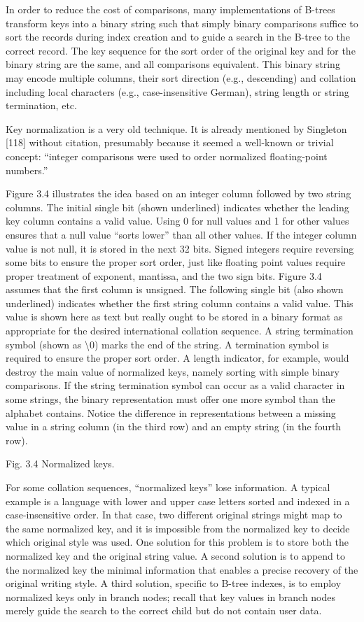 In order to reduce the cost of comparisons, many implementations of
B-trees transform keys into a binary string such that simply binary
comparisons suffice to sort the records during index creation and to
guide a search in the B-tree to the correct record. The key sequence for
the sort order of the original key and for the binary string are the
same, and all comparisons equivalent. This binary string may encode
multiple columns, their sort direction (e.g., descending) and collation
including local characters (e.g., case-insensitive German), string
length or string termination, etc.

Key normalization is a very old technique. It is already mentioned by
Singleton {[}118{]} without citation, presumably because it seemed a
well-known or trivial concept: ``integer comparisons were used to order
normalized floating-point numbers.''

Figure 3.4 illustrates the idea based on an integer column followed by
two string columns. The initial single bit (shown underlined) indicates
whether the leading key column contains a valid value. Using 0 for null
values and 1 for other values ensures that a null value ``sorts lower''
than all other values. If the integer column value is not null, it is
stored in the next 32 bits. Signed integers require reversing some bits
to ensure the proper sort order, just like floating point values require
proper treatment of exponent, mantissa, and the two sign bits. Figure
3.4 assumes that the first column is unsigned. The following single bit
(also shown underlined) indicates whether the first string column
contains a valid value. This value is shown here as text but really
ought to be stored in a binary format as appropriate for the desired
international collation sequence. A string termination symbol (shown as
\textbackslash{}0) marks the end of the string. A termination symbol is
required to ensure the proper sort order. A length indicator, for
example, would destroy the main value of normalized keys, namely sorting
with simple binary comparisons. If the string termination symbol can
occur as a valid character in some strings, the binary representation
must offer one more symbol than the alphabet contains. Notice the
difference in representations between a missing value in a string column
(in the third row) and an empty string (in the fourth row).

Fig. 3.4 Normalized keys.

For some collation sequences, ``normalized keys'' lose information. A
typical example is a language with lower and upper case letters sorted
and indexed in a case-insensitive order. In that case, two different
original strings might map to the same normalized key, and it is
impossible from the normalized key to decide which original style was
used. One solution for this problem is to store both the normalized key
and the original string value. A second solution is to append to the
normalized key the minimal information that enables a precise recovery
of the original writing style. A third solution, specific to B-tree
indexes, is to employ normalized keys only in branch nodes; recall that
key values in branch nodes merely guide the search to the correct child
but do not contain user data.

